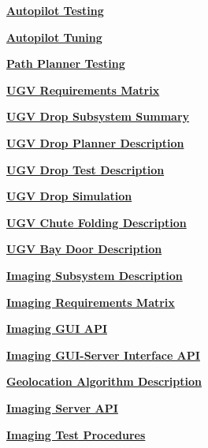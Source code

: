 \documentclass[]{article}
\newcounter{includepdfpage}
\newcommand{\pdflink}[2]{
\hyperlink{#1.1}{\textbf{#2}}
}
\newcommand{\pdflinkdoc}[2]{

}
\begin{document}
\pdflink{con_tes}{Autopilot Testing}

\pdflink{con_tun}{Autopilot Tuning}

\pdflink{pat_tes}{Path Planner Testing}

\pdflink{ugv_req}{UGV Requirements Matrix}

\pdflink{ugv_des}{UGV Drop Subsystem Summary}

\pdflink{ugv_drd}{UGV Drop Planner Description}

\pdflink{drp_tes}{UGV Drop Test Description}

\pdflink{drp_sim}{UGV Drop Simulation}

\pdflink{chu_fol}{UGV Chute Folding Description}

\pdflink{bay_des}{UGV Bay Door Description}

\pdflink{isd}{Imaging Subsystem Description}

\pdflink{irm}{Imaging Requirements Matrix}

\pdflink{iga}{Imaging GUI API}

\pdflink{igsia}{Imaging GUI-Server Interface API}

\pdflink{gad}{Geolocation Algorithm Description}

\pdflink{isa}{Imaging Server API}

\pdflink{itp}{Imaging Test Procedures}


\pdflinkdoc{proj_cont}{./../ProjectContract/Capstone Team 45 Project Contract.pdf}
\pdflinkdoc{des_sum}{./PrimaryArtifacts/Design Summary/main.pdf}
\pdflinkdoc{des_des}{./PrimaryArtifacts/DesignDescription/DesignDescription.pdf}
\pdflinkdoc{sys_per}{./PrimaryArtifacts/Summary of System Performance/main.pdf}
\pdflinkdoc{req_mat}{./PrimaryArtifacts/SysRequirementsMatrix/requirements_matrix.pdf}
\end{document}
